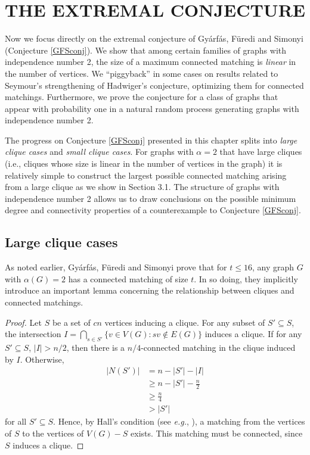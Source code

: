 \chapter{THE EXTREMAL CONJECTURE}

Now we focus directly on the extremal conjecture of Gy\'arf\'as, F\"uredi and Simonyi (Conjecture \ref{GFSconj}).  We show that among certain families of graphs with independence number 2, the size of a maximum connected matching is {\it linear} in the number of vertices.  We ``piggyback'' in some cases on results related to Seymour's strengthening of Hadwiger's conjecture, optimizing them for connected matchings.  Furthermore, we prove  the conjecture for a class of graphs that appear with probability one in a natural random process generating graphs with independence number 2. 

The progress on Conjecture \ref{GFSconj} presented in this chapter splits into {\it large clique cases} and {\it small clique cases}.  For graphs with $\alpha = 2$ that have large cliques (i.e., cliques whose size is linear in the number of vertices in the graph) it is relatively simple to construct the largest possible connected matching arising from a large clique as we show in Section 3.1.  The structure of graphs with independence number 2 allows us to draw conclusions on the possible minimum degree and connectivity properties of a counterexample to Conjecture \ref{GFSconj}.
  

\section{Large clique cases}

As noted earlier, Gy\'{a}rf\'{a}s, F\"{u}redi and Simonyi prove that for $t \leq 16$, any graph $G$ with $\alpha(G) = 2$ has a connected matching of size $t$.  In so doing, they implicitly introduce an important lemma concerning the relationship between cliques and connected matchings.  


\begin{proof}
	Let $S$ be a set of $cn$ vertices inducing a clique.  For any subset of $S'\subseteq S$, the intersection $\displaystyle I = \bigcap_{s\in S'} \{v \in V(G): sv \notin E(G)\}$ induces a clique.  If for any $S'\subseteq S$, $|I| > n/2$, then there is a $n/4$-connected matching in the clique induced by $I$.  Otherwise, 
\begin{align*}
|N(S')| &= n- |S'| - |I|\\
	&\geq n - |S'| - \frac{n}{2}\\
	&\geq \frac{n}{4} \\
	&> |S'| 
\end{align*} for all $S'\subseteq S$.  Hence, by Hall's condition (see {\it e.g.}, \cite{dwest}),  a matching from the vertices of $S$ to the vertices of $V(G)-S$ exists.  This matching must be connected, since $S$ induces a clique.
\end{proof}

